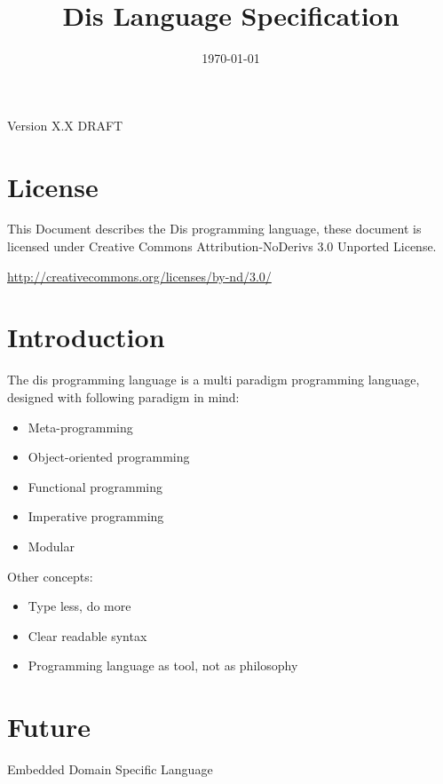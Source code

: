 \documentclass[a4paper,fleqn]{article}
\title{Dis Language Specification}
\date{\today}
\author{}
\begin{document}
\maketitle
\begin{center}
Version X.X DRAFT
\end{center}

\newpage
\tableofcontents
\newpage

\section*{License}

\begin{flushleft}
This Document describes the Dis programming language, these document is licensed under Creative Commons Attribution-NoDerivs 3.0 Unported License.

\url{http://creativecommons.org/licenses/by-nd/3.0/}
\end{flushleft}

\section{Introduction}

The dis programming language is a multi paradigm programming language, designed with following paradigm in mind:
\begin{itemize}
\item Meta-programming
\item Object-oriented programming
\item Functional programming
\item Imperative programming
\item Modular
\end{itemize}

Other concepts:
\begin{itemize}
\item Type less, do more
\item Clear readable syntax
\item Programming language as tool, not as philosophy
\end{itemize}











\section{Future}
Embedded Domain Specific Language
\end{document}
